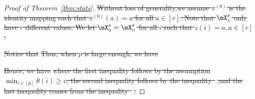 \documentclass[lettersize,onecolumn,journal]{IEEEtran}
\theoremstyle{definition}
\theoremstyle{definition}
\newcommand{\of}[1]{\left(#1\right)}
\providecommand{\DIFdeltex}[1]{{\protect\color{red}\sout{#1}}}                      %
\providecommand{\DIFdel}[1]{\texorpdfstring{\DIFdeltex{#1}}{}} %
\begin{document}
\begin{proof}[Proof of Theorem~\ref{thm:stats}]

\DIFdel{Without loss of generality,we assume $\pi^{(0)}$ is the identity mapping such that  $\pi^{(0)}(a) = a$ for all $ a \in [r]$. Note that $\mX_{i:}^s$ only have $r$ different values. We let $\mX_a^s = \mX_{i:}^s$ for all $i$ such that $z(i) = a, a \in [r]$. 
}%

\DIFdel{Notice that 
}%
\DIFdel{Thus, when $p$ is large enough, we have 
}%

\DIFdel{Hence, we have 
}%
\DIFdel{where the first inequality follows by the assumption $\min_{i \in [p]} \theta(i) \geq c$, the second inequality follows by the inequality~}%
\DIFdel{,and the last inequality comes from the inequality~}%
\DIFdel{.
}%


\end{proof}
\end{document}
